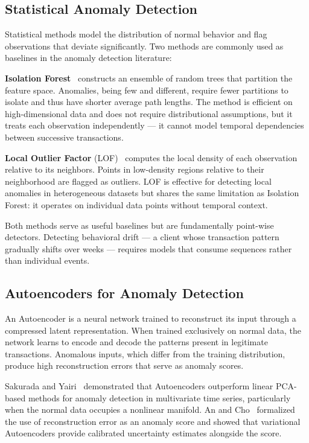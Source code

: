 \subsection{Statistical Anomaly Detection}

Statistical methods model the distribution of normal behavior and flag
observations that deviate significantly. Two methods are commonly used
as baselines in the anomaly detection literature:

\textbf{Isolation Forest}~\cite{liu2008} constructs an ensemble of
random trees that partition the feature space. Anomalies, being few and
different, require fewer partitions to isolate and thus have shorter
average path lengths. The method is efficient on high-dimensional data
and does not require distributional assumptions, but it treats each
observation independently --- it cannot model temporal dependencies
between successive transactions.

\textbf{Local Outlier Factor} (LOF)~\cite{breunig2000} computes the
local density of each observation relative to its neighbors. Points in
low-density regions relative to their neighborhood are flagged as
outliers. LOF is effective for detecting local anomalies in
heterogeneous datasets but shares the same limitation as Isolation
Forest: it operates on individual data points without temporal context.

Both methods serve as useful baselines but are fundamentally
point-wise detectors. Detecting behavioral drift --- a client whose
transaction pattern gradually shifts over weeks --- requires models
that consume sequences rather than individual events.

\subsection{Autoencoders for Anomaly Detection}

An Autoencoder is a neural network trained to reconstruct its input
through a compressed latent representation. When trained exclusively
on normal data, the network learns to encode and decode the patterns
present in legitimate transactions. Anomalous inputs, which differ
from the training distribution, produce high reconstruction errors
that serve as anomaly scores.

Sakurada and Yairi~\cite{sakurada2014} demonstrated that Autoencoders
outperform linear PCA-based methods for anomaly detection in
multivariate time series, particularly when the normal data occupies a
nonlinear manifold. An and Cho~\cite{an2015} formalized the use of
reconstruction error as an anomaly score and showed that variational
Autoencoders provide calibrated uncertainty estimates alongside the
score.

